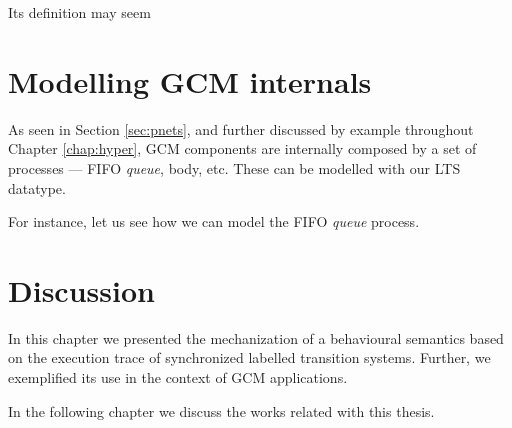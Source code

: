 					

	\noindent Its definition may seem
	



\section{Modelling GCM internals}
\label{sec:gcmpnets}


	 As seen in Section \ref{sec:pnets}, and further discussed by example throughout Chapter \ref{chap:hyper},
   \ac{GCM} components are internally composed by a set of processes --- \ac{FIFO} \textit{queue}, \textsf{body}, 
   etc. These can be modelled with our \textsf{LTS} datatype.
   
   	For instance, let us see how we can model the \ac{FIFO} \textit{queue} process.  
 	



\section{Discussion}
\label{sec:behaviourdiscussion}

	
	


\chapbreak

	In this chapter we presented the mechanization of a behavioural 
semantics based on the execution trace of synchronized labelled transition systems. Further, we
exemplified its use in the context of \ac{GCM} applications.
	
	In the following chapter we discuss the works related with this thesis.




